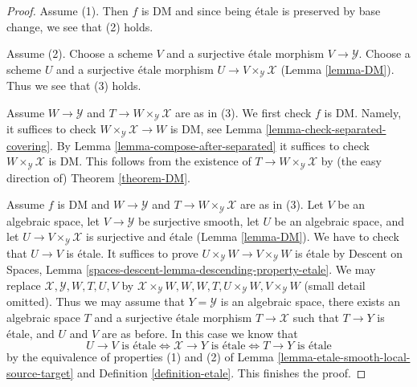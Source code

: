 \documentclass[10pt,a4paper]{amsart}
\theoremstyle{plain}
\theoremstyle{definition}
\theoremstyle{remark}
\numberwithin{equation}{subsection}
\begin{document}
\begin{proof}
Assume (1). Then $f$ is DM and since being \'etale is preserved
by base change, we see that (2) holds.

\medskip\noindent
Assume (2). Choose a scheme $V$ and a surjective \'etale morphism
$V \to \mathcal{Y}$. Choose a scheme $U$ and a surjective \'etale morphism
$U \to V \times_\mathcal{Y} \mathcal{X}$ (Lemma \ref{lemma-DM}).
Thus we see that (3) holds.

\medskip\noindent
Assume $W \to \mathcal{Y}$ and $T \to W \times_\mathcal{Y} \mathcal{X}$
are as in (3). We first check $f$ is DM. Namely, it suffices to check
$W \times_\mathcal{Y} \mathcal{X} \to W$ is DM, see
Lemma \ref{lemma-check-separated-covering}.
By Lemma \ref{lemma-compose-after-separated}
it suffices to check $W \times_\mathcal{Y} \mathcal{X}$ is DM.
This follows from the existence of $T \to W \times_\mathcal{Y} \mathcal{X}$
by (the easy direction of) Theorem \ref{theorem-DM}.

\medskip\noindent
Assume $f$ is DM and $W \to \mathcal{Y}$ and
$T \to W \times_\mathcal{Y} \mathcal{X}$ are as in (3).
Let $V$ be an algebraic space, let $V \to \mathcal{Y}$ be surjective smooth,
let $U$ be an algebraic space, and let
$U \to V \times_\mathcal{Y} \mathcal{X}$ is surjective and \'etale
(Lemma \ref{lemma-DM}). We have to check that $U \to V$ is \'etale.
It suffices to prove $U \times_\mathcal{Y} W \to V \times_\mathcal{Y} W$
is \'etale by Descent on Spaces, Lemma
\ref{spaces-descent-lemma-descending-property-etale}.
We may replace $\mathcal{X}, \mathcal{Y}, W, T, U, V$ by
$\mathcal{X} \times_\mathcal{Y} W, W, W, T, U \times_\mathcal{Y} W,
V \times_\mathcal{Y} W$ (small detail omitted).
Thus we may assume that $Y = \mathcal{Y}$ is an algebraic space, there exists
an algebraic space $T$ and a surjective \'etale morphism
$T \to \mathcal{X}$ such that $T \to Y$ is \'etale, and $U$ and $V$
are as before. In this case we know that
$$
U \to V\text{ is \'etale}
\Leftrightarrow
\mathcal{X} \to Y\text{ is \'etale}
\Leftrightarrow
T \to Y\text{ is \'etale}
$$
by the equivalence of properties (1) and (2) of
Lemma \ref{lemma-etale-smooth-local-source-target}
and Definition \ref{definition-etale}.
This finishes the proof.
\end{proof}
\end{document}
